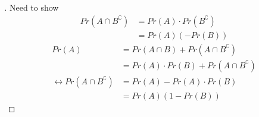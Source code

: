 \documentclass[a4paper,12pt]{article}
\begin{document}
\begin{proof}[]
    Need to show 
    \begin{align*}
        Pr(A \cap B^{\complement}) &= Pr(A) \cdot Pr(B^\complement)\\
        &= Pr(A)(-Pr(B))
    \end{align*}
    \begin{align*}
        Pr(A) &= Pr(A \cap B) + Pr(A \cap B^\complement)\\
        &= Pr(A)\cdot Pr(B) + Pr(A \cap B^\complement)\\ 
        \leftrightarrow Pr(A \cap B^{\complement}) &= Pr(A) - Pr(A)\cdot Pr(B)\\
        &= Pr(A)(1-Pr(B))
    \end{align*}
\end{proof}
\end{document}
